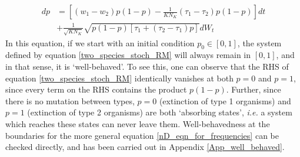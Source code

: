 \begin{equation}
	\label{two_species_stoch_RM}
	\begin{aligned}
		dp &= \left[(w_1 - w_2)p(1-p) - \frac{1}{KN_K}(\tau_1-\tau_2)p(1-p)\right]dt\\
		&+ \frac{1}{\sqrt{KN_K}}\sqrt{p(1-p)\left[\tau_1 + (\tau_2 - \tau_1)p\right]}dW_t
	\end{aligned}
\end{equation}
In this equation, if we start with an initial condition $p_0 \in [0,1]$, the system defined by equation \eqref{two_species_stoch_RM} will always remain in $[0,1]$, and in that sense, it is `well-behaved'. To see this, one can observe that the RHS of equation \eqref{two_species_stoch_RM} identically vanishes at both $p=0$ and $p=1$, since every term on the RHS contains the product $p(1-p)$. Further, since there is no mutation between types, $p=0$ (extinction of type 1 organisms) and $p=1$ (extinction of type 2 organisms) are both `absorbing states', \emph{i.e.} a system which reaches these states can never leave them. Well-behavedness at the boundaries for the more general equation \eqref{nD_eqn_for_frequencies} can be checked directly, and has been carried out in Appendix \ref{App_well_behaved}.

